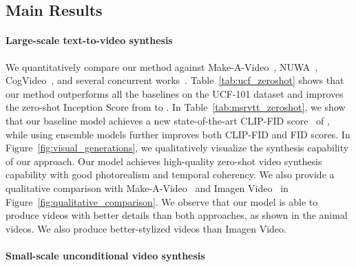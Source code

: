 \documentclass[10pt,twocolumn,letterpaper]{article}
\begin{document}
\subsection{Main Results}

\paragraph{Large-scale text-to-video synthesis}
We quantitatively compare our method against Make-A-Video~\cite{singer2022make}, NUWA~\cite{wu2022nuwa}, CogVideo~\cite{hong2022cogvideo}, and several concurrent works~\cite{blattmann2023videoldm,zhou2022magicvideo,blattmann2023videoldm,wang2023videofactory,an2023latent}. Table~\ref{tab:ucf_zeroshot} shows that our method outperforms all the baselines on the UCF-101 dataset and improves the zero-shot Inception Score from  to .
In Table~\ref{tab:msrvtt_zeroshot}, we show that our baseline model achieves a new state-of-the-art CLIP-FID score~\cite{kynkaanniemi2023the} of , while using ensemble models further improves both CLIP-FID and FID scores.
In Figure~\ref{fig:visual_generations}, we qualitatively visualize the synthesis capability of our approach. Our model achieves high-quality zero-shot video synthesis capability with good photorealism and temporal coherency. We also provide a qualitative comparison with Make-A-Video~\cite{singer2022make} and Imagen Video~\cite{ho2022imagen} in Figure~\ref{fig:qualitative_comparison}. We observe that our model is able to produce videos with better details than both approaches, as shown in the animal videos. We also produce better-stylized videos than Imagen Video.


\paragraph{Small-scale unconditional video synthesis}

\setlength{\tabcolsep}{8pt}
\renewcommand{\arraystretch}{1}
\end{document}
